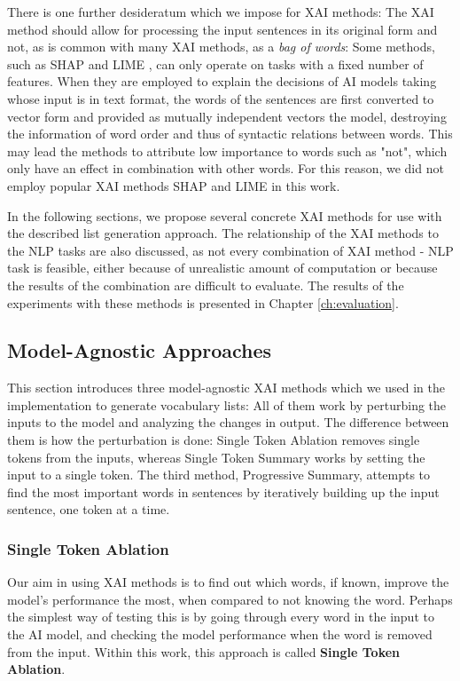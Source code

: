 There is one further desideratum which we impose for XAI methods:
The XAI method should allow for processing the input sentences in its original form and not, as is common with many XAI methods, as a \textit{bag of words}:
Some methods, such as SHAP and LIME , can only operate on tasks with a fixed number of features.
When they are employed to explain the decisions of AI models taking whose input is in text format, the words of the sentences are first converted to vector form and provided as mutually independent vectors the model, destroying the information of word order and thus of syntactic relations between words.
This may lead the methods to attribute low importance to words such as "not", which only have an effect in combination with other words.
For this reason, we did not employ popular XAI methods SHAP and LIME in this work.

In the following sections, we propose several concrete XAI methods for use with the described list generation approach.
The relationship of the XAI methods to the NLP tasks are also discussed, as not every combination of XAI method - NLP task is feasible, either because of unrealistic amount of computation or because the results of the combination are difficult to evaluate.
The results of the experiments with these methods is presented in Chapter \ref{ch:evaluation}.

\subsection{Model-Agnostic Approaches}
This section introduces three model-agnostic XAI methods which we used in the implementation to generate vocabulary lists:
All of them work by perturbing the inputs to the model and analyzing the changes in output.
The difference between them is how the perturbation is done:
Single Token Ablation removes single tokens from the inputs, whereas Single Token Summary works by setting the input to a single token.
The third method, Progressive Summary, attempts to find the most important words in sentences by iteratively building up the input sentence, one token at a time.

\subsubsection{Single Token Ablation}
Our aim in using XAI methods is to find out which words, if known, improve the model's performance the most, when compared to not knowing the word.
Perhaps the simplest way of testing this is by going through every word in the input to the AI model, and checking the model performance when the word is removed from the input.
Within this work, this approach is called \textbf{Single Token Ablation}.

